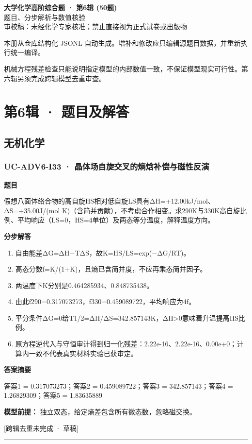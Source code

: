 \documentclass[UTF8,11pt,a4paper]{ctexart}
\begin{document}
\begin{center}
{\LARGE\bfseries 大学化学高阶综合题 · 第6辑 (50题)}\\[0.8em]
{\large 题目、分步解析与数值核验}\\[0.5em]
{\small \textcolor{red!65!black}{审校稿：未经化学专家核准；禁止直接视为正式试卷或出版物}}
\end{center}
\vspace{1em}
\noindent 本册从仓库结构化 JSONL 自动生成。增补和修改应只编辑源题目数据，并重新执行统一编译。
\par 机械方程残差检查只能说明指定模型的内部数值一致，不保证模型现实可行性。第六辑另须完成跨辑模型去重审查。
\tableofcontents
\clearpage
\section*{第6辑 · 题目及解答}
\subsection*{无机化学}
\subsubsection*{UC-ADV6-I33 · 晶体场自旋交叉的熵焓补偿与磁性反演}
\noindent\textbf{题目}\par
假想八面体络合物的高自旋HS相对低自旋LS具有ΔH=+12.00kJ/mol、ΔS=+35.00J/(mol K)（含简并贡献），不考虑合作相变。求290K与330K高自旋比例、平均响应（LS=0，HS=4单位）及两态等分温度，解释温度方向。\par
\medskip\noindent\textbf{分步解答}
\begin{enumerate}
\item 自由能差ΔG=ΔH−TΔS，故K=HS/LS=exp(−ΔG/RT)。
\item 高态分数f=K/(1+K)，且熵已含简并度，不应再乘态简并因子。
\item 两温度下K分别是0.464285934、0.848735438。
\item 由此f290=0.317073273，f330=0.459089722，平均响应为4f。
\item 平分条件ΔG=0给T1/2=ΔH/ΔS=342.857143K，ΔH>0意味着升温提高HS比例。
\item 原方程逆代入与守恒审计得到归一化残差：2.22e-16、2.22e-16、0.00e+0；计算内一致不代表真实材料实验已获审定。
\end{enumerate}
\noindent\textbf{答案摘要}\par
答案1 = 0.317073273；答案2 = 0.459089722；答案3 = 342.857143；答案4 = 1.26829309；答案5 = 1.83635889\par
\noindent\textbf{模型前提：}
独立双态，给定熵差包含所有微态数，忽略磁交换。\par
\noindent\textcolor{red!65!black}{[跨辑去重未完成 · 草稿]} \par
\medskip\hrule\medskip
{}
\end{document}
